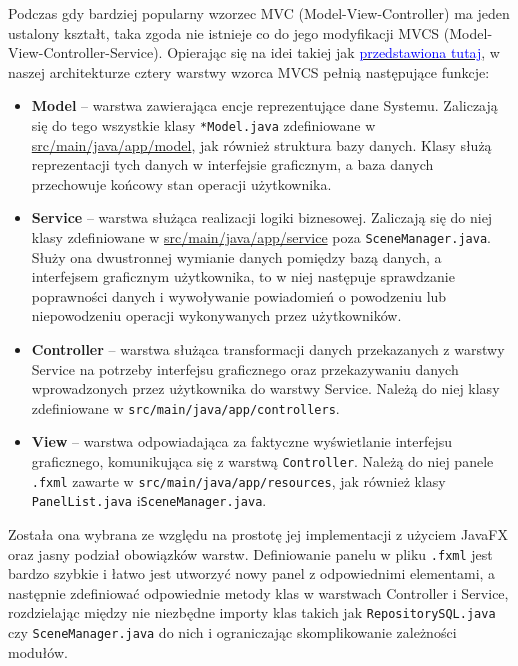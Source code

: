 \documentclass[a4paper,12pt]{article}
\begin{document}
Podczas gdy bardziej popularny wzorzec MVC (Model-View-Controller) ma jeden ustalony kształt, taka zgoda nie istnieje co do jego modyfikacji MVCS (Model-View-Controller-Service).
Opierając się na idei takiej jak \href{https://quantiphi.com/blog/an-introduction-to-mvcs-architecture/}{\textcolor{blue}{przedstawiona tutaj}}, w naszej architekturze cztery warstwy wzorca MVCS pełnią następujące funkcje:
\begin{itemize}
    \item \textbf{Model} -- warstwa zawierająca encje reprezentujące dane Systemu.
    Zaliczają się do tego wszystkie klasy \texttt{*Model.java} zdefiniowane w \url{src/main/java/app/model}, jak również struktura bazy danych.
    Klasy służą reprezentacji tych danych w interfejsie graficznym, a baza danych przechowuje końcowy stan operacji użytkownika.
    \item \textbf{Service} -- warstwa służąca realizacji logiki biznesowej.
    Zaliczają się do niej klasy zdefiniowane w \url{src/main/java/app/service} poza \texttt{SceneManager.java}.
    Służy ona dwustronnej wymianie danych pomiędzy bazą danych, a interfejsem graficznym użytkownika, to w niej następuje sprawdzanie poprawności danych i wywoływanie powiadomień o powodzeniu lub niepowodzeniu operacji wykonywanych przez użytkowników.
    \item \textbf{Controller} -- warstwa służąca transformacji danych przekazanych z warstwy Service na potrzeby interfejsu graficznego oraz przekazywaniu danych wprowadzonych przez użytkownika do warstwy Service.
    Należą do niej klasy zdefiniowane w \texttt{src/main/java/app/controllers}.
    \item \textbf{View} -- warstwa odpowiadająca za faktyczne wyświetlanie interfejsu graficznego, komunikująca się z warstwą \texttt{Controller}.
    Należą do niej panele \texttt{.fxml} zawarte w \texttt{src/main/java/app/resources}, jak również klasy \texttt{PanelList.java} i\linebreak\texttt{SceneManager.java}.
\end{itemize}

Została ona wybrana ze względu na prostotę jej implementacji z użyciem JavaFX oraz jasny podział obowiązków warstw.
Definiowanie panelu w pliku \texttt{.fxml} jest bardzo szybkie i łatwo jest utworzyć nowy panel z odpowiednimi elementami, a następnie zdefiniować odpowiednie metody klas w warstwach Controller i Service, rozdzielając między nie niezbędne importy klas takich jak \texttt{RepositorySQL.java} czy \texttt{SceneManager.java} do nich i ograniczając skomplikowanie zależności modułów.
\end{document}
